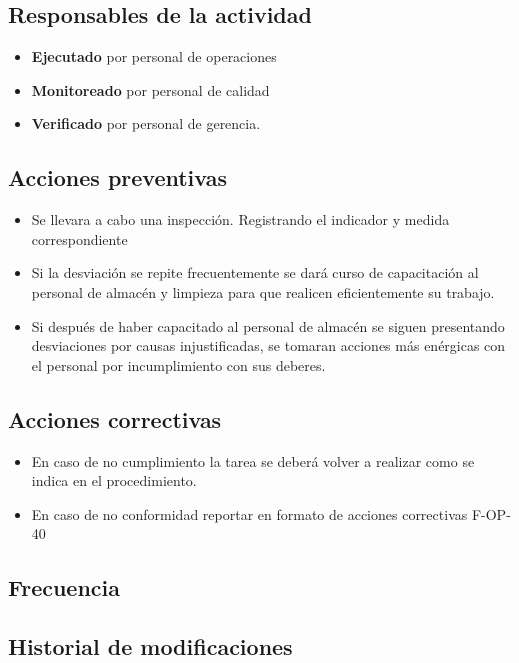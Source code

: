 \subsection{Responsables de la actividad}

\begin{itemize}
	\item \textbf{Ejecutado} por personal de operaciones
	\item \textbf{Monitoreado} por personal de calidad
	\item \textbf{Verificado} por personal de gerencia.
\end{itemize}

\subsection{Acciones preventivas}

\begin{itemize}
	\item Se llevara a cabo una inspección. Registrando el indicador y medida correspondiente
	\item Si la desviación se repite frecuentemente se dará curso de capacitación al personal de almacén y limpieza para que realicen eficientemente su trabajo.
	\item Si después de haber capacitado al personal de almacén se siguen presentando desviaciones por causas injustificadas, se tomaran acciones más enérgicas con el personal por incumplimiento con sus deberes.
\end{itemize}

\subsection{Acciones correctivas}

\begin{itemize}
	\item En caso de no cumplimiento la tarea se deberá volver a realizar como se indica en el procedimiento.
	\item En caso de no conformidad reportar en formato de acciones correctivas F-OP-40
\end{itemize}

\subsection{Frecuencia}

\subsection{Historial de modificaciones}

